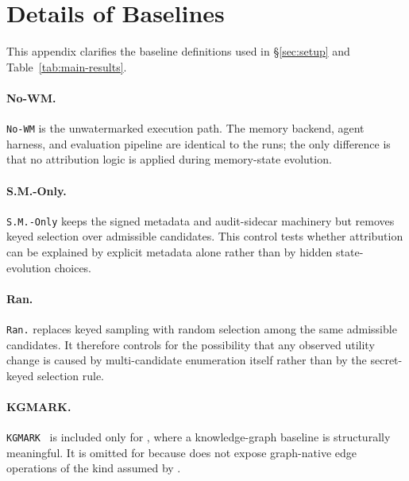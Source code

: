\section{Details of Baselines}
\label{app:baseline-details}

This appendix clarifies the baseline definitions used in
\S\ref{sec:setup} and Table~\ref{tab:main-results}.

\paragraph{No-WM.}
\texttt{No-WM} is the unwatermarked execution path. The memory backend,
agent harness, and evaluation pipeline are identical to the
\memmark{} runs; the only difference is that no attribution logic is
applied during memory-state evolution.

\paragraph{S.M.-Only.}
\texttt{S.M.-Only} keeps the signed metadata and audit-sidecar
machinery but removes keyed selection over admissible candidates. This
control tests whether attribution can be explained by explicit metadata
alone rather than by hidden state-evolution choices.

\paragraph{Ran.}
\texttt{Ran.} replaces keyed sampling with random selection among the
same admissible candidates. It therefore controls for the possibility
that any observed utility change is caused by multi-candidate
enumeration itself rather than by the secret-keyed selection rule.

\paragraph{KGMARK.}
\texttt{KGMARK}~\cite{kgmark} is included only for \graphiti{}, where a
knowledge-graph baseline is structurally meaningful. It is omitted for
\amem{} because \amem{} does not expose graph-native edge operations of
the kind assumed by \kgmark{}.
